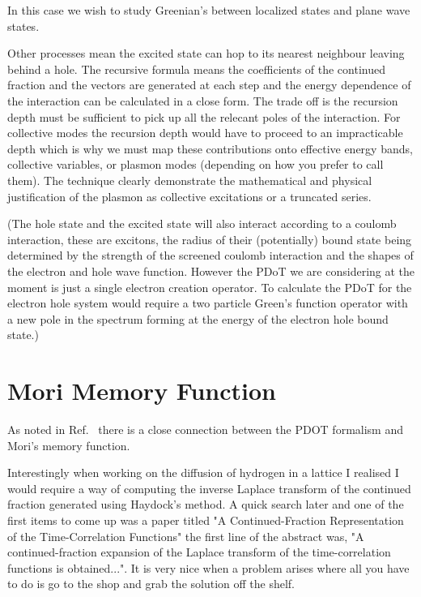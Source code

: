 In this case we wish to study Greenian's between localized states and plane wave states.

Other processes mean the excited state can hop 
to its nearest neighbour leaving behind a hole. The recursive formula means
the coefficients of the continued fraction and the vectors are generated at
each step and the energy dependence of the interaction can be calculated 
in a close form. The trade off is the recursion depth must be sufficient to
pick up all the relecant poles of the interaction. For collective modes
the recursion depth would have to proceed to an impracticable depth which
is why we must map these contributions onto effective energy bands, collective
variables, or plasmon modes (depending on how you prefer to call them). The technique
clearly demonstrate the mathematical and physical justification of the plasmon as
collective excitations or a truncated series.

(The hole state and the excited state will also interact according to a coulomb interaction,
these are excitons, the radius of their (potentially) bound state being determined 
by the strength of the screened coulomb interaction and the shapes of the electron and hole
wave function. However the PDoT we are considering at the moment is just a 
single electron creation operator.
To calculate the PDoT for the electron hole system would require a 
two particle Green's function operator with a new pole in the spectrum forming
at the energy of the electron hole bound state.)

\section{Mori Memory Function}
\label{sec:morimemory}
  As noted in Ref.~\cite{annett94} there is a close connection between the PDOT
formalism and Mori's memory function. 

Interestingly when working on the diffusion
of hydrogen in a lattice I realised I would require a way of computing the
inverse Laplace transform of the continued fraction generated 
using Haydock's method. A quick search later and one of the first items to come up
was a paper titled "A Continued-Fraction Representation of the Time-Correlation
Functions" the first line of the abstract was, "A continued-fraction expansion of the Laplace
transform of the time-correlation functions is obtained...". It is very nice when a problem
arises where all you have to do is go to the shop and grab the solution off the shelf.

